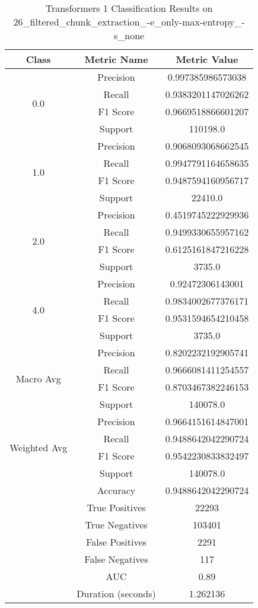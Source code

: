    
    \begin{longtable}{|c|c|c|}
    \caption{Transformers 1 Classification Results on 26\_filtered\_chunk\_extraction\_-e\_only-max-entropy\_-s\_none} \label{tab:transformers_1_classifiers_results} \\
    \hline
    Class & Metric Name & Metric Value \\
    \hline
    \multirow{4}{*}{0.0} & Precision & 0.997385986573038 \\
     & Recall & 0.9383201147026262 \\
     & F1 Score & 0.9669518866601207 \\
     & Support & 110198.0 \\
    \hline
    \multirow{4}{*}{1.0} & Precision & 0.9068093068662545 \\
     & Recall & 0.9947791164658635 \\
     & F1 Score & 0.9487594160956717 \\
     & Support & 22410.0 \\
    \hline
    \multirow{4}{*}{2.0} & Precision & 0.4519745222929936 \\
     & Recall & 0.9499330655957162 \\
     & F1 Score & 0.6125161847216228 \\
     & Support & 3735.0 \\
    \hline
    \multirow{4}{*}{4.0} & Precision & 0.92472306143001 \\
     & Recall & 0.9834002677376171 \\
     & F1 Score & 0.9531594654210458 \\
     & Support & 3735.0 \\
    \hline
    \multirow{4}{*}{Macro Avg} & Precision & 0.8202232192905741 \\
     & Recall & 0.9666081411254557 \\
     & F1 Score & 0.8703467382246153 \\
     & Support & 140078.0 \\
    \hline
    \multirow{4}{*}{Weighted Avg} & Precision & 0.9664151614847001 \\
     & Recall & 0.9488642042290724 \\
     & F1 Score & 0.9542230833832497 \\
     & Support & 140078.0 \\
    \hline
    & Accuracy & 0.9488642042290724 \\ \hline
    & True Positives & 22293 \\ \hline
    & True Negatives & 103401 \\ \hline
    & False Positives & 2291 \\ \hline
    & False Negatives & 117 \\ \hline
    & AUC & 0.89 \\ \hline
    & Duration (seconds) & 1.262136 \\ \hline
    \end{longtable}
    
